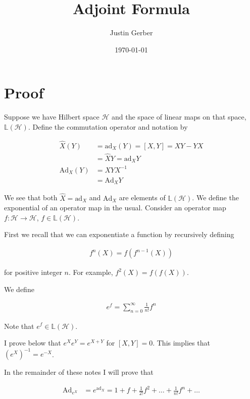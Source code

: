 \documentclass[12pt]{article}
\begin{document}
\title{Adjoint Formula}
\author{Justin Gerber}
\date{\today}
\maketitle

\section{Proof}

Suppose we have Hilbert space $\mathcal{H}$ and the space of linear maps on that space, $\mathbb{L}(\mathcal{H})$.
Define the commutation operator and notation by

\begin{align}
\hat{X}(Y) &= \text{ad}_X(Y) = [X,Y] = XY-YX\\
&= \hat{X}Y = \text{ad}_X Y\\
\text{Ad}_X(Y) &= X Y X^{-1}\\
&= \text{Ad}_XY
\end{align}

We see that both $\hat{X} = \text{ad}_X$ and $\text{Ad}_X$ are elements of $\mathbb{L}(\mathcal{H})$. We define the exponential of an operator map in the usual. Consider an operator map $f: \mathcal{H} \rightarrow \mathcal{H}$, $f \in \mathbb{L}(\mathcal{H})$.

First we recall that we can exponentiate a function by recursively defining 

\begin{align}
f^n(X) = f(f^{n-1}(X))
\end{align}

for positive integer $n$. For example, $f^2(X) = f(f(X))$.

We define

\begin{align}
e^{f} = \sum_{n=0}^{\infty} \frac{1}{n!} f^n
\end{align}

Note that $e^f \in \mathbb{L}(\mathcal{H})$.

I prove below that $e^{X}e^{Y} = e^{X+Y}$ for $[X,Y]=0$. This implies that $\left(e^X\right)^{-1} = e^{-X}$.

In the remainder of these notes I will prove that

\begin{align}
\text{Ad}_{e^X} &= e^{\text{ad}_X} = 1 + f + \frac{1}{2!} f^2 + \ldots + \frac{1}{n!} f^n + \ldots\\
\end{align}
\end{document}

